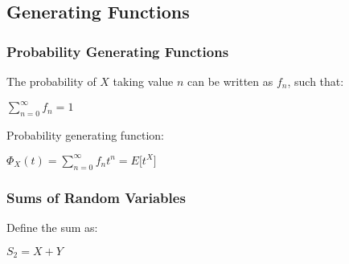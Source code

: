 \documentclass[12pt]{article}
\newcommand\textline[4][t]{%
  \par\smallskip\noindent\parbox[#1]{.35\textwidth}{\raggedright\texttt{}#2}%
  \parbox[#3]{.65\textwidth}{\raggedright\texttt{}#3}%
}
\begin{document}
\subsection*{Generating Functions}
\subsubsection*{Probability Generating Functions}
\textline{The probability of $X$ taking value $n$ can be written as $f_n$, such that:}{$\sum\limits_{n=0}^{\infty}f_{n} = 1$}
\newline
\textline{Probability generating function:}{$\Phi_X(t) = \sum\limits_{n=0}^\infty f_n t^n = E \lbrack t^X \rbrack $}
\newline
\subsubsection*{Sums of Random Variables}
\textline{Define the sum as:}{$S_2 = X + Y$}
\newline
\newline
{}
	
\end{document}
